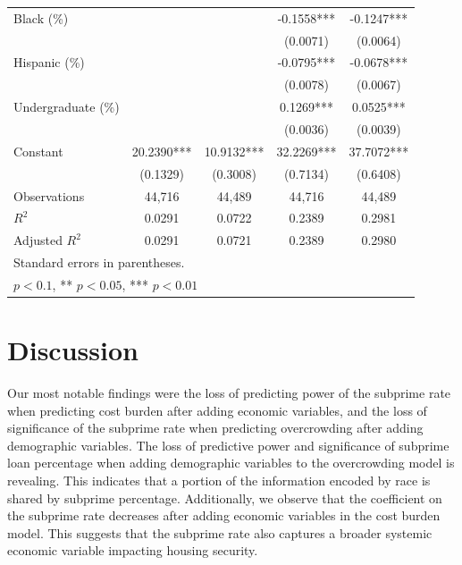 \documentclass{article}
\begin{document}
\begin{table}[htbp]
{\begin{tabular}{lcccc}
    Black (\%)              &             &             & -0.1558***  & -0.1247*** \\
                            &             &             & (0.0071)    & (0.0064) \\[0.5em]
    Hispanic (\%)           &             &             & -0.0795***  & -0.0678*** \\
                            &             &             & (0.0078)    & (0.0067) \\[0.5em]
    Undergraduate (\%)      &             &             & 0.1269***   & 0.0525*** \\
                            &             &             & (0.0036)    & (0.0039) \\[0.5em]
    Constant                & 20.2390***  & 10.9132***  & 32.2269***  & 37.7072*** \\
                            & (0.1329)    & (0.3008)    & (0.7134)    & (0.6408) \\
    \midrule
    Observations   & 44,716 & 44,489 & 44,716 & 44,489 \\
    $R^2$          & 0.0291 & 0.0722 & 0.2389 & 0.2981 \\
    Adjusted $R^2$ & 0.0291 & 0.0721 & 0.2389 & 0.2980 \\
    \bottomrule
    \multicolumn{5}{l}{\footnotesize Standard errors in parentheses.} \\
    \multicolumn{5}{l}{\footnotesize * $p < 0.1$, ** $p < 0.05$, *** $p < 0.01$}
    \end{tabular}%
    }
\end{table}

\clearpage

\section{Discussion}

Our most notable findings were the loss of predicting power of the subprime rate when predicting cost burden after adding economic variables, and the loss of significance of the subprime rate when predicting overcrowding after adding demographic variables. The loss of predictive power and significance of subprime loan percentage when adding demographic variables to the overcrowding model is revealing. This indicates that a portion of the information encoded by race is shared by subprime percentage. Additionally, we observe that the coefficient on the subprime rate decreases after adding economic variables in the cost burden model. This suggests that the subprime rate also captures a broader systemic economic variable impacting housing security. 
\end{document}
